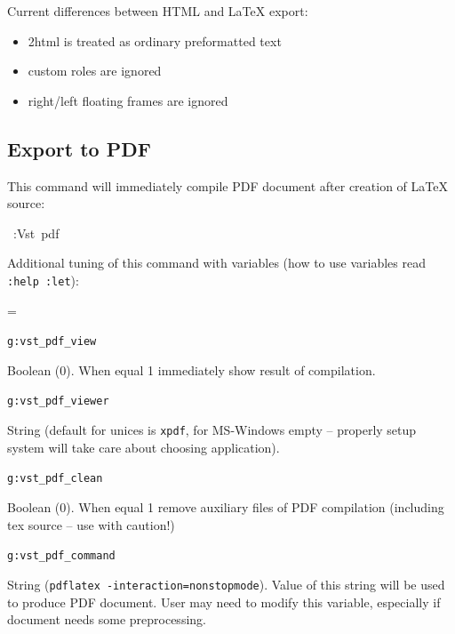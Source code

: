\documentclass[12pt]{article}
\newenvironment{deflist}[1]{%
\begin{list}{}
{\renewcommand{\makelabel}[1]{\textbf{##1}\hfill}
\settowidth{\labelwidth}{\textbf{#1}}
\leftmargin=\labelwidth
\advance \leftmargin\labelsep}}
{\end{list}}
\begin{document}
Current differences between HTML and \LaTeX{} export:

\begin{itemize}
\item
2html is treated as ordinary preformatted text

\item
custom roles are ignored

\item
right/left floating frames are ignored
\end{itemize}
\hypertarget{lexport-to-pdf}{}
\subsection{Export to PDF}

This command will immediately compile PDF document after creation of
\LaTeX{} source:

\begin{ttfamily}\begin{flushleft}
\mbox{~:Vst~pdf}\\
\end{flushleft}\end{ttfamily}

Additional tuning of this command with variables (how to use variables read
\texttt{:help :let}):

\begin{deflist}{iii}

\item[\texttt{g:vst\_pdf\_view}]

Boolean (0). When equal 1 immediately show result of compilation.

\item[\texttt{g:vst\_pdf\_viewer}]

String (default for unices is \texttt{xpdf}, for MS-Windows empty
-- properly setup system will take care about choosing application).

\item[\texttt{g:vst\_pdf\_clean}]

Boolean (0). When equal 1 remove auxiliary files of PDF compilation
(including tex source -- use with caution!)

\item[\texttt{g:vst\_pdf\_command}]

String (\texttt{pdflatex -interaction=nonstopmode}). Value of this string will
be used to produce PDF document. User may need to modify this variable,
especially if document needs some preprocessing.
\end{deflist}
\hypertarget{lexport-to-xml}{}
\end{document}
